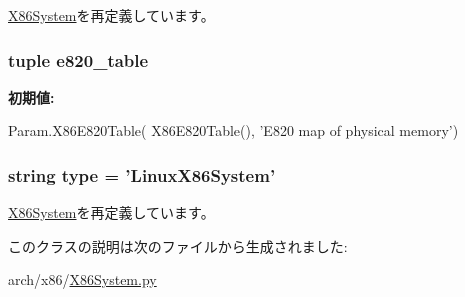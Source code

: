 \hyperlink{classX86System_1_1X86System_a17da7064bc5c518791f0c891eff05fda}{X86System}を再定義しています。\hypertarget{classX86System_1_1LinuxX86System_a9bba18742b9defc72dc847cfddf0f2d1}{
\subsubsection[{e820\_\-table}]{\setlength{\rightskip}{0pt plus 5cm}tuple {\bf e820\_\-table}}}
\label{classX86System_1_1LinuxX86System_a9bba18742b9defc72dc847cfddf0f2d1}
{\bfseries 初期値:}
\begin{DoxyCode}
Param.X86E820Table(
            X86E820Table(), 'E820 map of physical memory')
\end{DoxyCode}
\hypertarget{classX86System_1_1LinuxX86System_acce15679d830831b0bbe8ebc2a60b2ca}{
\subsubsection[{type}]{\setlength{\rightskip}{0pt plus 5cm}string {\bf type} = '{\bf LinuxX86System}'}}
\label{classX86System_1_1LinuxX86System_acce15679d830831b0bbe8ebc2a60b2ca}


\hyperlink{classX86System_1_1X86System_acce15679d830831b0bbe8ebc2a60b2ca}{X86System}を再定義しています。

このクラスの説明は次のファイルから生成されました:\begin{DoxyCompactItemize}
\item 
arch/x86/\hyperlink{X86System_8py}{X86System.py}\end{DoxyCompactItemize}
